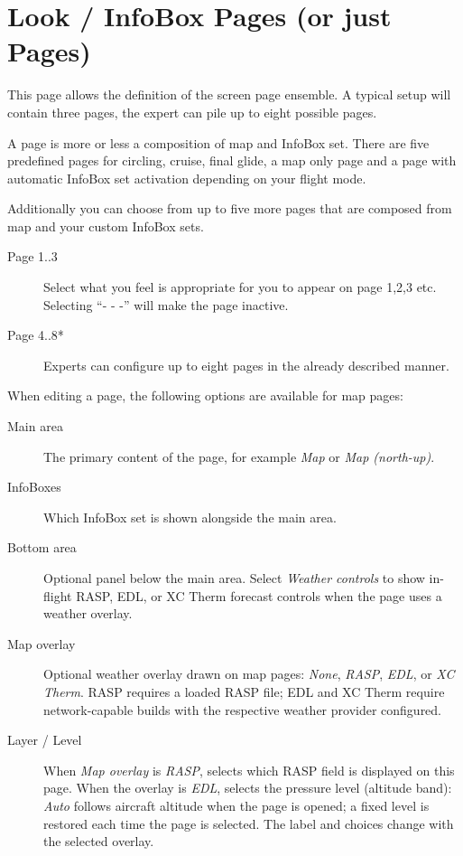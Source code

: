 \section{Look / InfoBox Pages (or just Pages)}\label{conf:screenpages}

This page allows the definition of the screen page ensemble. A typical setup 
will contain three pages, the expert can pile up to eight possible pages.

A page is more or less a composition of map and InfoBox set. There are five 
predefined pages for circling, cruise, final glide, a map only page and a 
page with automatic InfoBox set activation depending on your flight mode.

Additionally you can choose from up to five more pages that are composed from map 
and your custom InfoBox sets.  

\begin{description}
\item[Page 1..3]  Select what you feel is appropriate for you to appear on page 1,2,3 etc. 
  Selecting ``- - -'' will make the page inactive.
\item[Page 4..8*]  Experts can configure up to eight pages in the already 
  described manner.
\end{description}

When editing a page, the following options are available for map pages:
\begin{description}
\item[Main area]  The primary content of the page, for example \emph{Map}
  or \emph{Map (north-up)}.
\item[InfoBoxes]  Which InfoBox set is shown alongside the main area.
\item[Bottom area]  Optional panel below the main area.  Select
  \emph{Weather controls} to show in-flight RASP, EDL, or XC Therm forecast
  controls when the page uses a weather overlay.
\item[Map overlay]  Optional weather overlay drawn on map pages: \emph{None},
  \emph{RASP}, \emph{EDL}, or \emph{XC Therm}.  RASP requires a loaded RASP
  file; EDL and XC Therm require network-capable builds with the respective
  weather provider configured.
\item[Layer / Level]  When \emph{Map overlay} is \emph{RASP}, selects
  which RASP field is displayed on this page.  When the overlay is
  \emph{EDL}, selects the pressure level (altitude band): \emph{Auto}
  follows aircraft altitude when the page is opened; a fixed level is
  restored each time the page is selected.  The label and choices
  change with the selected overlay.
\end{description}


